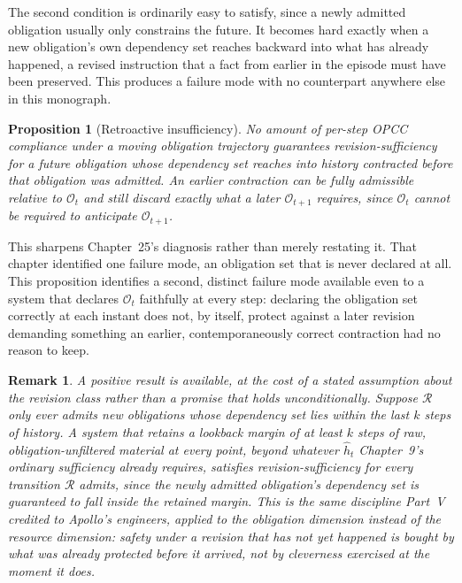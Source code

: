 \documentclass[11pt]{report}
\newtheorem{proposition}[definition]{Proposition}
\newtheorem{remark}[definition]{Remark}
\begin{document}
The second condition is ordinarily easy to satisfy, since a newly admitted obligation usually only constrains the future. It becomes hard exactly when a new obligation's own dependency set reaches backward into what has already happened, a revised instruction that a fact from earlier in the episode must have been preserved. This produces a failure mode with no counterpart anywhere else in this monograph.

\begin{proposition}[Retroactive insufficiency]
No amount of per-step OPCC compliance under a moving obligation trajectory guarantees revision-sufficiency for a future obligation whose dependency set reaches into history contracted before that obligation was admitted. An earlier contraction can be fully admissible relative to $\mathcal O_t$ and still discard exactly what a later $\mathcal O_{t+1}$ requires, since $\mathcal O_t$ cannot be required to anticipate $\mathcal O_{t+1}$.
\end{proposition}

This sharpens Chapter~25's diagnosis rather than merely restating it. That chapter identified one failure mode, an obligation set that is never declared at all. This proposition identifies a second, distinct failure mode available even to a system that declares $\mathcal O_t$ faithfully at every step: declaring the obligation set correctly at each instant does not, by itself, protect against a later revision demanding something an earlier, contemporaneously correct contraction had no reason to keep.

\begin{remark}
A positive result is available, at the cost of a stated assumption about the revision class rather than a promise that holds unconditionally. Suppose $\mathcal R$ only ever admits new obligations whose dependency set lies within the last $k$ steps of history. A system that retains a lookback margin of at least $k$ steps of raw, obligation-unfiltered material at every point, beyond whatever $\widehat h_t$ Chapter~9's ordinary sufficiency already requires, satisfies revision-sufficiency for every transition $\mathcal R$ admits, since the newly admitted obligation's dependency set is guaranteed to fall inside the retained margin. This is the same discipline Part~V credited to Apollo's engineers, applied to the obligation dimension instead of the resource dimension: safety under a revision that has not yet happened is bought by what was already protected before it arrived, not by cleverness exercised at the moment it does.
\end{remark}
\end{document}
